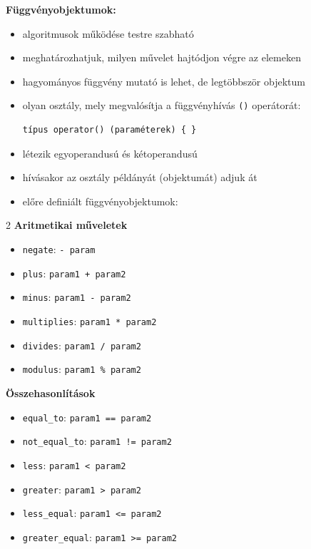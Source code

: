 \textbf{Függvényobjektumok:}
\begin{itemize}
    \item algoritmusok működése testre szabható
    \item meghatározhatjuk, milyen művelet hajtódjon végre az elemeken
    \item hagyományos függvény mutató is lehet, de legtöbbször objektum
    \item olyan osztály, mely megvalósítja a függvényhívás \texttt{()} operátorát:
\begin{verbatim}
típus operator() (paraméterek) { }
\end{verbatim}
    \item létezik egyoperandusú és kétoperandusú
    \item hívásakor az osztály példányát (objektumát) adjuk át
    \item előre definiált függvényobjektumok:
\end{itemize}

\begin{multicols}{2}
\textbf{Aritmetikai műveletek}
\begin{itemize}
    \item \texttt{negate}: \texttt{- param}
    \item \texttt{plus}: \texttt{param1 + param2}
    \item \texttt{minus}: \texttt{param1 - param2}
    \item \texttt{multiplies}: \texttt{param1 * param2}
    \item \texttt{divides}: \texttt{param1 / param2}
    \item \texttt{modulus}: \texttt{param1 \% param2}
\end{itemize}

\columnbreak

\textbf{Összehasonlítások}
\begin{itemize}
    \item \texttt{equal\_to}: \texttt{param1 == param2}
    \item \texttt{not\_equal\_to}: \texttt{param1 != param2}
    \item \texttt{less}: \texttt{param1 < param2}
    \item \texttt{greater}: \texttt{param1 > param2}
    \item \texttt{less\_equal}: \texttt{param1 <= param2}
    \item \texttt{greater\_equal}: \texttt{param1 >= param2}
\end{itemize}
\end{multicols}
